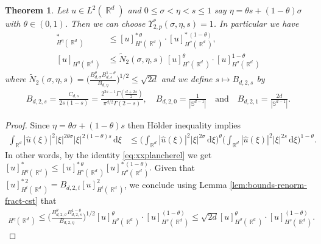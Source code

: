 \documentclass[12pt, reqno]{amsart}%
\theoremstyle{plain}  %
\newtheorem{theorem}{Theorem}[section]
\theoremstyle{definition}  %
\theoremstyle{remark}
\numberwithin{equation}{section}
\DeclareMathOperator{\R}{\mathbb{R}}
\renewcommand{\d}{\,\mathrm{d}}
\begin{document}
\begin{theorem}
\label{thm:robust-interpo-L2}
Let  $u\in L^2(\R^d)$  and $0\leq \sigma<\eta<s\leq 1$  say $\eta =  \theta s+(1-\theta) \sigma$ with $\theta\in (0,1)$. Then we can choose $\Upsilon^*_{2,p}(\sigma, \eta, s)=1$. In particular we have
\begin{align*}
[u]^*_{H^\eta (\R^d)} &\leq[u]^{*\,\theta}_{H^s (\R^d)} \cdot  [u]^{*\,(1-\theta)}_{H^\sigma(\R^d)},
\\
[u]_{H^\eta (\R^d)}
&\leq \widetilde{N}_2(\sigma, \eta, s) \, [u]_{H^s (\R^d)}^{\theta}  \cdot [u]_{H^\sigma(\R^d)}^{1-\theta}
\end{align*}
where $\widetilde{N}_2(\sigma, \eta, s)=\big(\tfrac{B_{d,\sigma}^{\theta}B_{d,s}^{1-\theta}}{B_{d,\eta}} \big)^{1/2}\leq \sqrt{2d}$
and we define $s\mapsto B_{d,2,s}$ by
\begin{align*}
B_{d,2,s}= \frac{C_{d,s}}{2s(1-s)} =\frac{2^{2s-1} \Gamma\left( \frac{d + 2s}{2} \right)}{\pi^{d/2} \Gamma(2 - s)},
\quad
B_{d,2,0}=\frac{1}{|\mathbb{S}^{d-1}|}\quad\text{and}\quad B_{d,2,1}=\frac{2d}{|\mathbb{S}^{d-1}|}.
\end{align*}
\end{theorem}

\begin{proof}
Since  $\eta= \theta\sigma +(1-\theta) s$ then H\"older inequality implies
\begin{align*}
\int_{\R^d}|\hat{u}(\xi)|^2
|\xi|^{2\theta \sigma} |\xi|^{2(1-\theta)s}\d \xi
&\leq
\Big(  \int_{\R^d}|\hat{u}(\xi)|^2
|\xi|^{2\sigma}\d \xi\Big)^{\theta}\Big(  \int_{\R^d}|\hat{u}(\xi)|^2
|\xi|^{2s}\d \xi\Big)^{1-\theta}.
\end{align*}
In other words,  by the identity \eqref{eq:xxplancherel} we get
$[u]^*_{H^\eta (\R^d)}\leq[u]^{*\,\theta}_{H^s (\R^d)} [u]^{*\,(1-\theta)}_{H^\sigma(\R^d)}. $
Given that $[u]^{*\,2}_{H^{t}(\R^d)}= B_{d,2,t} [u]^2_{H^{t}(\R^d)}$, we conclude using Lemma \ref{lem:bounds-renorm-fract-cst} that
\begin{align*}
[u]_{H^\eta (\R^d)}\leq \big(\tfrac{B_{d,2,\sigma}^{\theta}B_{d,2,s}^{1-\theta}}{B_{d,2,\eta}} \big)^{1/2} [u]_{H^\sigma(\R^d)}^{\theta}\cdot [u]_{H^s (\R^d)}^{(1-\theta)} \leq  \sqrt{2d} [u]_{H^\sigma(\R^d)}^{\theta}\cdot [u]_{H^s (\R^d)}^{(1-\theta)}.
\end{align*}
\end{proof}
\end{document}
